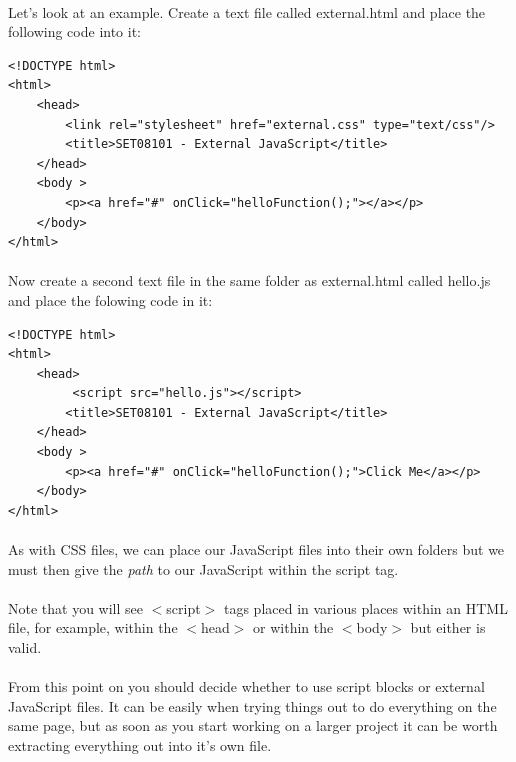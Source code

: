 \documentclass[10pt, a4paper, twosize]{article}
\begin{document}
\paragraph{} Let's look at an example. Create a text file called external.html and place the following code into it:

\begin{lstlisting}
<!DOCTYPE html>
<html>
    <head>
        <link rel="stylesheet" href="external.css" type="text/css"/>
        <title>SET08101 - External JavaScript</title>
    </head>
    <body >
        <p><a href="#" onClick="helloFunction();"></a></p>
    </body>
</html>
\end{lstlisting}

\paragraph{} Now create a second text file in the same folder as external.html called hello.js and place the folowing code in it:

\begin{lstlisting}
<!DOCTYPE html>
<html>
    <head>
         <script src="hello.js"></script> 
        <title>SET08101 - External JavaScript</title>
    </head>
    <body >
        <p><a href="#" onClick="helloFunction();">Click Me</a></p>
    </body>
</html>
\end{lstlisting}

\paragraph{} As with CSS files, we can place our JavaScript files into their own folders but we must then give the \emph{path} to our JavaScript within the script tag.

\paragraph{} Note that you will see $<$script$>$ tags placed in various places within an HTML file, for example, within the $<$head$>$ or within the $<$body$>$ but either is valid.

\paragraph{} From this point on you should decide whether to use script blocks or external JavaScript files. It can be easily when trying things out to do everything on the same page, but as soon as you start working on a larger project it can be worth extracting everything out into it's own file.
\end{document}
